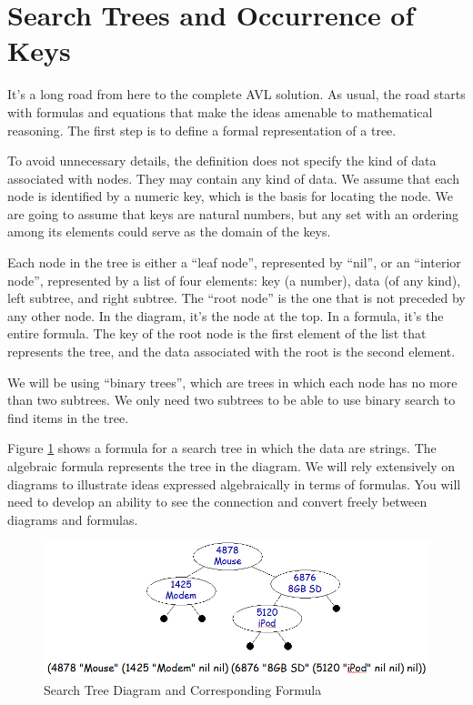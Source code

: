 \section{Search Trees and Occurrence of Keys}

It's a long road from here to the complete AVL solution.
As usual, the road starts with formulas and equations that make the ideas
amenable to mathematical reasoning.
The first step is to define a formal representation of a tree.

To avoid unnecessary details, the definition
does not specify the kind of data associated with nodes.
They may contain any kind of data.
We assume that each node is identified by a numeric key,
which is the basis for locating the node.
We are going to assume that keys are natural numbers,
but any set with an ordering among its elements could serve
as the domain of the keys.

\label{leaf-node}
Each node in the tree is either a ``leaf node'', represented by ``nil'',
\label{interior-node}
or an ``interior node'', represented by a list of four elements:
key (a number), data (of any kind), left subtree, and right subtree.
\label{root-node}
The ``root node'' is the one that is not preceded by any other node.
In the diagram, it's the node at the top.
In a formula, it's the entire formula.
The key of the root node is the first element of the list that represents the tree,
and the data associated with the root is the second element.

We will be using ``binary trees'', which are trees
in which each node has no more than two subtrees.
We only need two subtrees to be able to use binary search
to find items in the tree.

Figure \ref{fig:searchtree-diagram} shows a formula
for a search tree in which the data are strings.
The algebraic formula represents the tree in the diagram.
We will rely extensively on diagrams to
illustrate ideas expressed algebraically in terms of formulas.
You will need to develop an ability to see the connection
and convert freely between diagrams and formulas.

\begin{figure}
\begin{center}
\includegraphics[scale=0.5]{images/searchtree.png}
\end{center}
\caption{Search Tree Diagram and Corresponding Formula}
\label{fig:searchtree-diagram}
\end{figure}

